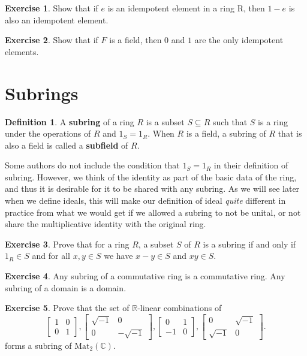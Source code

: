 \documentclass[12pt]{report}
\numberwithin{equation}{section}
\numberwithin{theorem}{chapter}
\theoremstyle{definition}
\newtheorem{definition}[theorem]{Definition}
\newtheorem{exercise}{Exercise}
\newtheorem*{basic properties}{Basic Properties}
\newtheorem*{Important Remark}{Important Remark}
\newcommand{\df}[1]{{\bf #1}\index{#1}}
\newcommand{\C}{\mathbb{C}}
\begin{document}
\begin{exercise}
Show that if $e$ is an idempotent element in a ring R, then $1-e$ is also an idempotent element.
\end{exercise}

\begin{exercise}
	Show that if $F$ is a field, then $0$ and $1$ are the only idempotent elements.
\end{exercise}



\section{Subrings}


\begin{definition}\label{def:subring} 
A \df{subring} of a ring $R$ is a subset $S \subseteq R$ such that $S$ is a ring under the operations of $R$ and $1_S = 1_R$.
When $R$ is a field, a subring of $R$ that is also a field is called a \df{subfield} of $R$.
\end{definition}


Some authors do not include the condition that $1_S = 1_R$ in their definition of subring. However, we think of the identity as part of the basic data of the ring, and thus it is desirable for it to be shared with any subring. As we will see later when we define ideals, this will make our definition of ideal \emph{quite} different in practice from what we would get if we allowed a subring to not be unital, or not share the multiplicative identity with the original ring.

\begin{exercise}\label{subring test}
Prove that for a ring $R$, a subset $S$ of $R$ is a subring if and only if
  $1_R \in S$ and for all $x,y \in S$ we have $x-y \in S$ and $xy \in S$.
\end{exercise}




\begin{exercise}\label{subring commutative ring}
 Any subring of a commutative ring is a commutative ring. Any subring of a domain is  a domain.
 \end{exercise}


\begin{exercise}\label{exercise quaternions ring}
Prove that the set of $\mathbb{R}$-linear combinations of 
$$\begin{bmatrix}
1 & 0 \\ 0 & 1
\end{bmatrix},
\begin{bmatrix}
\sqrt{-1} & 0 \\ 0 & -\sqrt{-1} 
\end{bmatrix},
\begin{bmatrix}
0 & 1 \\ -1 & 0 
\end{bmatrix},
\begin{bmatrix}
0 & \sqrt{-1} \\ \sqrt{-1} & 0 
\end{bmatrix}.$$
forms a subring of $\mathrm{Mat}_{2}(\C)$. 
\end{exercise}
\end{document}
